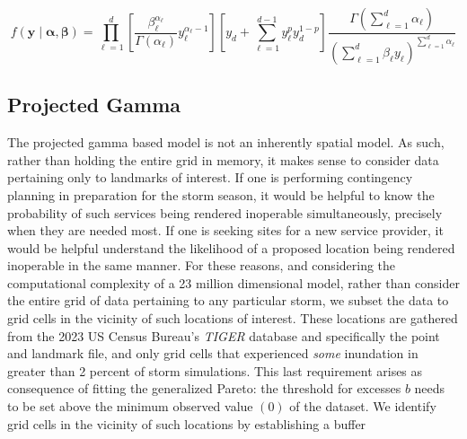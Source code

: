     \[
        f(\bm{y}\mid\bm{\alpha},\bm{\beta}) = \prod_{\ell = 1}^d\left[
            \frac{\beta_{\ell}^{\alpha_{\ell}}}{\Gamma(\alpha_{\ell})}
            y_{\ell}^{\alpha_{\ell} - 1}\right]
            \left[y_d + \sum_{\ell = 1}^{d-1}y_{\ell}^py_d^{1-p}\right]
            \frac{\Gamma(\sum_{\ell = 1}^d \alpha_{\ell})}{\left(
                \sum_{\ell = 1}^d\beta_{\ell}y_{\ell}
                \right)^{\sum_{\ell = 1}^d \alpha_{\ell}}
            }
    \]






















\subsection{Projected Gamma}






The projected gamma based model is not an inherently spatial model.  As such, 
    rather than holding the entire grid in memory, it makes sense to consider 
    data pertaining only to landmarks of interest.    If one is performing 
    contingency planning in preparation for the storm season, it would be 
    helpful to know the probability of such services being rendered inoperable 
    simultaneously, precisely when they are needed most.  If one is seeking 
    sites for a new service provider, it would be helpful understand the 
    likelihood of a proposed location being rendered inoperable in the same 
    manner.  For these reasons, and considering the computational complexity of 
    a 23 million dimensional model, rather than consider the entire grid of data 
    pertaining to any particular storm, we subset the data to grid cells in the 
    vicinity of such locations of interest.  These locations are gathered from 
    the 2023 US Census Bureau's \emph{TIGER} database \needcite and specifically 
    the point and landmark file, and only grid cells that experienced \emph{some} 
    inundation in greater than 2  percent of storm 
    simulations.   This last requirement arises as consequence of fitting the 
    generalized Pareto: the threshold for excesses $b$ needs to be set above the 
    minimum observed value $(0)$ of the dataset.  
      We identify grid cells in 
    the vicinity of such locations by establishing a buffer 



